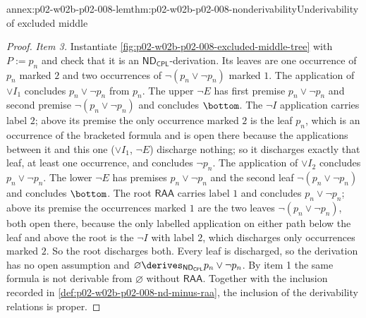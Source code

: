 \begin{annexitem}{annex:p02-w02b-p02-008-lem}{thm:p02-w02b-p02-008-nonderivability}{Underivability of excluded middle}
\begin{proof}
\emph{Item 3.}  Instantiate
\cref{fig:p02-w02b-p02-008-excluded-middle-tree} with \(P:=p_n\) and check
that it is an \(\mathsf{ND}_{\mathsf{CPL}}\)-derivation.  Its leaves are one
occurrence of \(p_n\) marked \(2\) and two occurrences of
\(\neg(p_n\lor\neg p_n)\) marked \(1\).  The application of \(\lor I_1\)
concludes \(p_n\lor\neg p_n\) from \(p_n\).  The upper \(\neg E\) has first
premise \(p_n\lor\neg p_n\) and second premise \(\neg(p_n\lor\neg p_n)\) and
concludes \(\bottom\).  The \(\neg I\) application carries label \(2\);
above its premise the only occurrence marked \(2\) is the leaf \(p_n\), which
is an occurrence of the bracketed formula and is open there because the
applications between it and this one (\(\lor I_1\), \(\neg E\)) discharge
nothing; so it discharges exactly that leaf, at least one occurrence, and
concludes \(\neg p_n\).  The application of \(\lor I_2\) concludes
\(p_n\lor\neg p_n\).  The lower \(\neg E\) has premises \(p_n\lor\neg p_n\)
and the second leaf \(\neg(p_n\lor\neg p_n)\) and concludes \(\bottom\).
The root \(\mathsf{RAA}\) carries label \(1\) and concludes \(p_n\lor\neg p_n\);
above its premise the occurrences marked \(1\) are the two leaves
\(\neg(p_n\lor\neg p_n)\), both open there, because the only labelled
application on either path below the leaf and above the root is the
\(\neg I\) with label \(2\), which discharges only occurrences marked \(2\).
So the root discharges both.  Every leaf is discharged, so the derivation
has no open assumption and
\(\varnothing\derives_{\mathsf{ND}_{\mathsf{CPL}}}p_n\lor\neg p_n\).  By
item 1 the same formula is not derivable from \(\varnothing\) without
\(\mathsf{RAA}\).  Together with the inclusion recorded in
\cref{def:p02-w02b-p02-008-nd-minus-raa}, the inclusion of the derivability
relations is proper.
\end{proof}
\end{annexitem}
